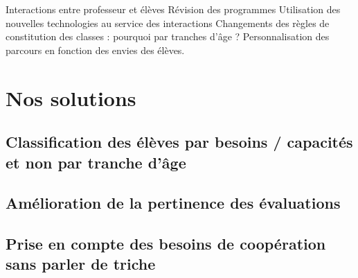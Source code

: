 Interactions entre professeur et élèves
Révision des programmes
Utilisation des nouvelles technologies au service des interactions
Changements des règles de constitution des classes : pourquoi par tranches d'âge ?
Personnalisation des parcours en fonction des envies des élèves.


\section{Nos solutions}
\subsection{Classification des élèves par besoins / capacités  et non par tranche d'âge}
\subsection{Amélioration de la pertinence des évaluations}
\subsection{Prise en compte des besoins de coopération sans parler de triche}

